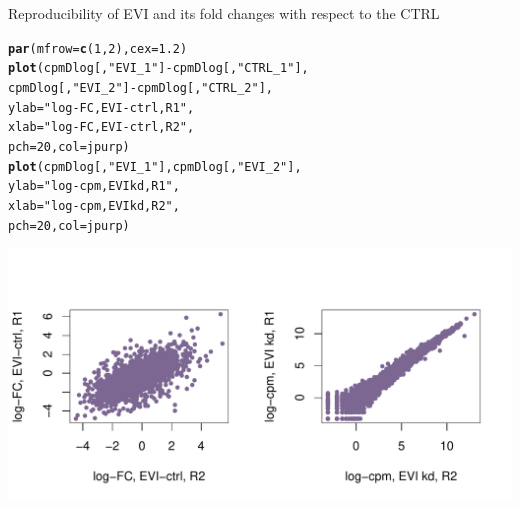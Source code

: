 \documentclass[a4paper]{article}\usepackage[]{graphicx}\usepackage[]{color}
\makeatletter
\def\maxwidth{ %
  \ifdim\Gin@nat@width>\linewidth
    \linewidth
  \else
    \Gin@nat@width
  \fi
}
\newcommand{\hlnum}[1]{\textcolor[rgb]{0.686,0.059,0.569}{#1}}%
\newcommand{\hlstr}[1]{\textcolor[rgb]{0.192,0.494,0.8}{#1}}%
\newcommand{\hlopt}[1]{\textcolor[rgb]{0,0,0}{#1}}%
\newcommand{\hlstd}[1]{\textcolor[rgb]{0.345,0.345,0.345}{#1}}%
\newcommand{\hlkwc}[1]{\textcolor[rgb]{0.333,0.667,0.333}{#1}}%
\newcommand{\hlkwd}[1]{\textcolor[rgb]{0.737,0.353,0.396}{\textbf{#1}}}%
\newenvironment{kframe}{%
 \def\at@end@of@kframe{}%
 \ifinner\ifhmode%
  \def\at@end@of@kframe{\end{minipage}}%
  \begin{minipage}{\columnwidth}%
 \fi\fi%
 \def\FrameCommand##1{\hskip\@totalleftmargin \hskip-\fboxsep
 \colorbox{shadecolor}{##1}\hskip-\fboxsep
     \hskip-\linewidth \hskip-\@totalleftmargin \hskip\columnwidth}%
 \MakeFramed {\advance\hsize-\width
   \@totalleftmargin\z@ \linewidth\hsize
   \@setminipage}}%
 {\par\unskip\endMakeFramed%
 \at@end@of@kframe}
\newenvironment{knitrout}{}{} %
\makeatother
\begin{document}
Reproducibility of EVI and its fold changes with respect to the CTRL
\begin{knitrout}
\color{fgcolor}\begin{kframe}
\begin{alltt}
\hlkwd{par}\hlstd{(}\hlkwc{mfrow}\hlstd{=}\hlkwd{c}\hlstd{(}\hlnum{1}\hlstd{,}\hlnum{2}\hlstd{),} \hlkwc{cex}\hlstd{=}\hlnum{1.2}\hlstd{)}
\hlkwd{plot}\hlstd{(cpmDlog[,}\hlstr{"EVI_1"}\hlstd{]}\hlopt{-}\hlstd{cpmDlog[,}\hlstr{"CTRL_1"}\hlstd{],}
     \hlstd{cpmDlog[,}\hlstr{"EVI_2"}\hlstd{]}\hlopt{-}\hlstd{cpmDlog[,}\hlstr{"CTRL_2"}\hlstd{],}
     \hlkwc{ylab}\hlstd{=}\hlstr{"log-FC, EVI-ctrl, R1"}\hlstd{,}
     \hlkwc{xlab}\hlstd{=}\hlstr{"log-FC, EVI-ctrl, R2"}\hlstd{,}
     \hlkwc{pch}\hlstd{=}\hlnum{20}\hlstd{,} \hlkwc{col}\hlstd{=jpurp)}
\hlkwd{plot}\hlstd{(cpmDlog[,}\hlstr{"EVI_1"}\hlstd{], cpmDlog[,}\hlstr{"EVI_2"}\hlstd{],}
     \hlkwc{ylab}\hlstd{=}\hlstr{"log-cpm, EVI kd, R1"}\hlstd{,}
     \hlkwc{xlab}\hlstd{=}\hlstr{"log-cpm, EVI kd, R2"}\hlstd{,}
     \hlkwc{pch}\hlstd{=}\hlnum{20}\hlstd{,} \hlkwc{col}\hlstd{=jpurp)}
\end{alltt}
\end{kframe}
\includegraphics[width=\maxwidth]{figure/voomRepEVI} 

\end{knitrout}
\end{document}
